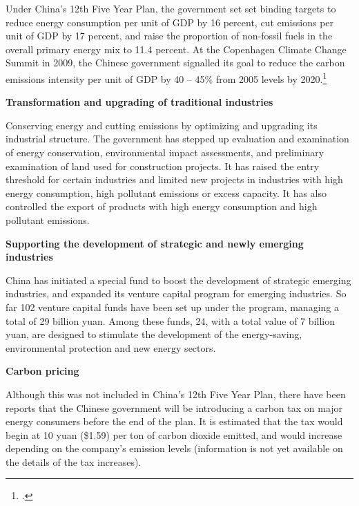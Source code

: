 Under China’s 12th Five Year Plan, the government set set binding targets to reduce energy consumption per unit of GDP by 16 percent, cut  emissions per unit of GDP by 17 percent, and raise the proportion of non-fossil fuels in the overall primary energy mix to 11.4 percent.  
At the Copenhagen Climate Change Summit in 2009, the Chinese government signalled its goal to reduce the carbon emissions intensity per unit of GDP by 40 -- 45\% from 2005 levels by 2020.\footcite[][p. 108]{UNHumanDev2013}



\textbf{Transformation and upgrading of traditional industries}



Conserving energy and cutting emissions by optimizing and upgrading its industrial structure. 
The government has stepped up evaluation and examination of energy conservation, environmental impact assessments, and preliminary examination of land used for construction projects. 
It has raised the entry threshold for certain industries and limited new projects in industries with high energy consumption, high pollutant emissions or excess capacity. 
It has also controlled the export of products with high energy consumption and high pollutant emissions. 



\textbf{Supporting the development of strategic and newly emerging industries}



China has initiated a special fund to boost the development of strategic emerging industries, and expanded its venture capital program for emerging industries. 
So far 102 venture capital funds have been set up under the program, managing a total of 29 billion yuan. 
Among these funds, 24, with a total value of 7 billion yuan, are designed to stimulate the development of the energy-saving, environmental protection and new energy sectors.




\textbf{Carbon pricing}



Although this was not included in China’s 12th Five Year Plan, there have been reports that the Chinese government will be introducing a carbon tax on major energy consumers before the end of the plan. 
It is estimated that the tax would begin at 10 yuan (\$1.59) per ton of carbon dioxide emitted, and would increase depending on the company’s emission levels (information is not yet available on the details of the tax increases).



